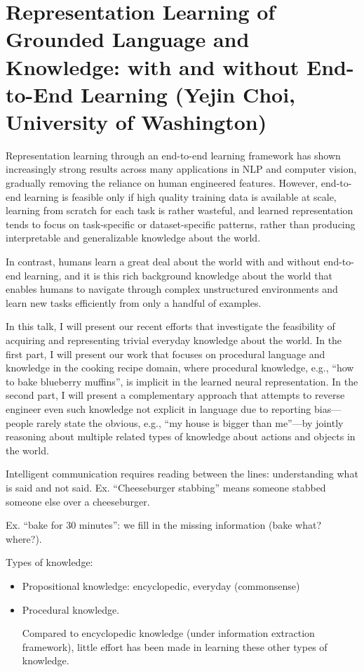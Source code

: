 \section{Representation Learning of Grounded Language and Knowledge: with and without End-to-End Learning (Yejin Choi, University of Washington)}

Representation learning through an end-to-end learning framework has shown increasingly strong results across many applications in NLP and computer vision, gradually removing the reliance on human engineered features. However, end-to-end learning is feasible only if high quality training data is available at scale, learning from scratch for each task is rather wasteful, and learned representation tends to focus on task-specific or dataset-specific patterns, rather than producing interpretable and generalizable knowledge about the world. 
 
In contrast, humans learn a great deal about the world with and without end-to-end learning, and it is this rich background knowledge about the world that enables humans to navigate through complex unstructured environments and learn new tasks efficiently from only a handful of examples.
 
In this talk, I will present our recent efforts that investigate the feasibility of acquiring and representing trivial everyday knowledge about the world. In the first part, I will present our work that focuses on procedural language and knowledge in the cooking recipe domain, where procedural knowledge, e.g., ``how to bake blueberry muffins'', is implicit in the learned neural representation. In the second part, I will present a complementary approach that attempts to reverse engineer even such knowledge not explicit in language due to reporting bias---people rarely state the obvious, e.g., ``my house is bigger than me''---by jointly reasoning about multiple related types of knowledge about actions and objects in the world.

Intelligent communication requires reading between the lines: understanding what is said and not said. Ex. ``Cheeseburger stabbing'' means someone stabbed someone else over a cheeseburger.

Ex. ``bake for 30 minutes'': we fill in the missing information (bake what? where?). 

Types of knowledge:
\begin{itemize}
\item
Propositional knowledge: encyclopedic, everyday (commonsense)
\item
Procedural knowledge.

Compared to encyclopedic knowledge (under information extraction framework), little effort has been made in learning these other types of knowledge.
\end{itemize}

